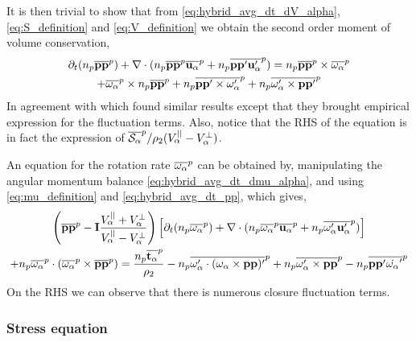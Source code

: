 It is then trivial  to show that from \ref{eq:hybrid_avg_dt_dV_alpha},\ref{eq:S_definition} and \ref{eq:V_definition} we obtain the second order moment of volume conservation,
\begin{multline}
    \partial_t (n_p\overline{\textbf{pp}}^{p})
    + \mathbf{\nabla} \cdot (
        n_p\overline{\textbf{pp}}^{p}\overline{\textbf{u}_\alpha}^{p}
        + n_p\overline{\textbf{pp}'\textbf{u}_\alpha'}^{p}
        )
    = 
    n_p\overline{\textbf{pp}}^{p} \times \overline{\omega_\alpha}^{p}\\
    + \overline{\omega_\alpha}^{p} \times n_p\overline{\textbf{pp}}^{p} 
    + n_p\overline{\textbf{pp}' \times \omega_\alpha'}^{p}
    +n_p\overline{\omega_\alpha' \times \textbf{pp}'}^{p}
    \label{eq:hybrid_avg_dt_pp}
\end{multline}
In agreement with \citet{advani1987use} which found similar results except that they brought empirical expression for the fluctuation terms. 
Also, notice that the RHS of the equation is in fact the expression of $\overline{\mathcal{S}_\alpha}^{p} /{ \rho_2 (V_\alpha^{||} - V_\alpha^\bot)}$.

An equation for the rotation rate $\overline{\omega_\alpha}^{p}$ can be obtained by, manipulating the angular momentum balance  \ref{eq:hybrid_avg_dt_dmu_alpha}, and using \ref{eq:mu_definition} and \ref{eq:hybrid_avg_dt_pp}, which gives,
\begin{multline}
    \left(
        \overline{\textbf{pp}}^{p} 
        - \textbf{I}\frac{V_\alpha^{||} + V_\alpha^\bot}{V_\alpha^{||} - V_\alpha^\bot}
    \right)\left[
        \partial_t (n_p\overline{\omega_\alpha}^{p})
        + \mathbf{\nabla} \cdot (
            n_p\overline{\omega_\alpha}^{p}\overline{\textbf{u}_\alpha}^{p}
            + n_p\overline{\omega_\alpha'\textbf{u}_\alpha'}^{p})
        \right]\\
    +  n_p\overline{\omega_\alpha}^{p}
    \cdot(\overline{\omega_\alpha}^{p} 
    \times \overline{\textbf{pp}}^{p})
    = \frac{n_p\overline{\textbf{t}_\alpha}^{p}}{\rho_2}
    -n_p\overline{\omega_\alpha' \cdot (\omega_\alpha \times \textbf{pp})'}^{p}
    +n_p\overline{\omega_\alpha' \times \textbf{pp}}^{p}
    - n_p\overline{\textbf{pp}'\dot{ \omega_\alpha}'}^{p}
\end{multline}
On the RHS we can observe that there is numerous closure fluctuation terms.  
\subsubsection*{Stress equation}

